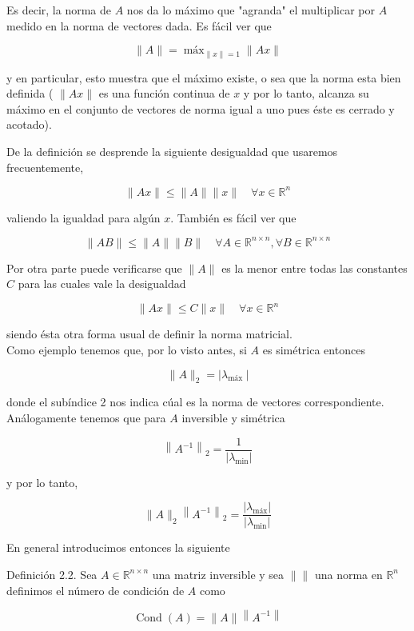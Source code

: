 \documentclass[10pt]{book}
\begin{document}
Es decir, la norma de $A$ nos da lo máximo que "agranda" el multiplicar por $A$ medido en la norma de vectores dada. Es fácil ver que

$$
\|A\|=\operatorname{máx}_{\|x\|=1}\|A x\|
$$

y en particular, esto muestra que el máximo existe, o sea que la norma esta bien definida ( $\|A x\|$ es una función continua de $x$ y por lo tanto, alcanza su máximo en el conjunto de vectores de norma igual a uno pues éste es cerrado y acotado).

De la definición se desprende la siguiente desigualdad que usaremos frecuentemente,

$$
\|A x\| \leq\|A\|\|x\| \quad \forall x \in \mathbb{R}^{n}
$$

valiendo la igualdad para algún $x$. También es fácil ver que


\begin{equation*}
\|A B\| \leq\|A\|\|B\| \quad \forall A \in \mathbb{R}^{n \times n}, \forall B \in \mathbb{R}^{n \times n} \tag{2.4}
\end{equation*}


Por otra parte puede verificarse que $\|A\|$ es la menor entre todas las constantes $C$ para las cuales vale la desigualdad

$$
\|A x\| \leq C\|x\| \quad \forall x \in \mathbb{R}^{n}
$$

siendo ésta otra forma usual de definir la norma matricial.\\
Como ejemplo tenemos que, por lo visto antes, si $A$ es simétrica entonces

$$
\|A\|_{2}=\left|\lambda_{\text {máx }}\right|
$$

donde el subíndice 2 nos indica cúal es la norma de vectores correspondiente.\\
Análogamente tenemos que para $A$ inversible y simétrica

$$
\left\|A^{-1}\right\|_{2}=\frac{1}{\left|\lambda_{\min }\right|}
$$

y por lo tanto,

$$
\|A\|_{2}\left\|A^{-1}\right\|_{2}=\frac{\left|\lambda_{\operatorname{máx}}\right|}{\left|\lambda_{\min }\right|}
$$

En general introducimos entonces la siguiente

Definición 2.2. Sea $A \in \mathbb{R}^{n \times n}$ una matriz inversible y sea $\left\|\|\right.$ una norma en $\mathbb{R}^{n}$ definimos el número de condición de $A$ como

$$
\operatorname{Cond}(A)=\|A\|\left\|A^{-1}\right\|
$$
\end{document}
